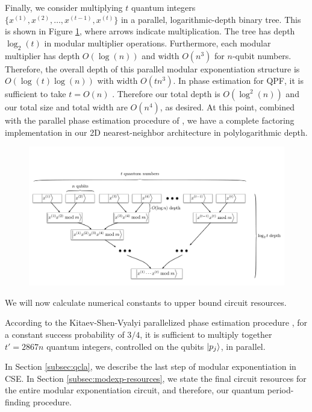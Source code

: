 \documentclass[twoside]{article}
\begin{document}
Finally, we consider multiplying $t$ quantum integers
$\{x^{(1)}, x^{(2)}, \ldots, x^{(t-1)}, x^{(t)}\}$ in a parallel,
logarithmic-depth binary tree.
This is shown in Figure \ref{fig:modexp-qq-parallel}, where arrows indicate multiplication.
The tree has depth $\log_2(t)$ in modular multiplier operations. Furthermore,
each
modular multiplier has depth $O(\log(n))$ and width $O(n^3)$ for $n$-qubit
numbers. Therefore, the overall depth of this parallel modular exponentiation
structure is $O(\log(t)\log(n))$ with width $O(tn^3)$.
In phase estimation for QPF, it is
sufficient to take $t = O(n)$ \cite{Nielsen2000,Kitaev2002}. Therefore our total depth is
$O(\log^2(n))$ and our total size and total width are $O(n^4)$, as desired. At this point, combined with the parallel phase
estimation procedure of \cite{Kitaev2002}, we have a complete factoring
implementation in our 2D nearest-neighbor architecture in polylogarithmic
depth.
%
\begin{figure}[tb!]
\centerline{
\includegraphics[width=5.5in]{./mod-exp-par.pdf}
}
\label{fig:modexp-qq-parallel}
\end{figure}

We will now calculate numerical
constants to upper bound circuit resources.

According to the Kitaev-Shen-Vyalyi parallelized phase estimation procedure
\cite{Kitaev2002},
for a constant success probability of $3/4$,
it is sufficient to multiply together $t' = 2867n$ quantum integers,
controlled on the qubits $\left\vert{p_j}\right\rangle$, in parallel.

In Section \ref{subsec:qcla}, we describe the last step of modular
exponentiation in CSE. In Section \ref{subsec:modexp-resources}, we
state the final circuit resources for the entire modular exponentiation
circuit,
and therefore, our quantum period-finding procedure.
\end{document}
